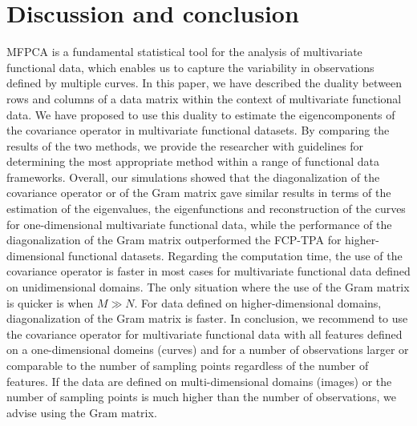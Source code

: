\section{Discussion and conclusion} %
\label{sec:discussion}

MFPCA is a fundamental statistical tool for the analysis of multivariate functional data, which enables us to capture the variability in observations defined by multiple curves. In this paper, we have described the duality between rows and columns of a data matrix within the context of multivariate functional data. We have proposed to use this duality to estimate the eigencomponents of the covariance operator in multivariate functional datasets. By comparing the results of the two methods, we provide the researcher with guidelines for determining the most appropriate method within a range of functional data frameworks. 
Overall, our simulations showed that the diagonalization of the covariance operator or of the Gram matrix gave similar results in terms of the estimation of the eigenvalues, the eigenfunctions and reconstruction of the curves for one-dimensional multivariate functional data, while the performance of the diagonalization of the Gram matrix outperformed the FCP-TPA for higher-dimensional functional datasets. Regarding the computation time, the use of the covariance operator is faster in most cases for multivariate functional data defined on unidimensional domains. The only situation where the use of the Gram matrix is quicker is when $M \gg N$. For data defined on higher-dimensional domains, diagonalization of the Gram matrix is faster.
In conclusion, we recommend to use the covariance operator for multivariate functional data with all features defined on a one-dimensional domeins (curves) and for a number of observations larger or comparable to the number of sampling points regardless of the number of features. If the data are defined on multi-dimensional domains (images) or the number of sampling points is much higher than the number of observations, we advise using the Gram matrix.

